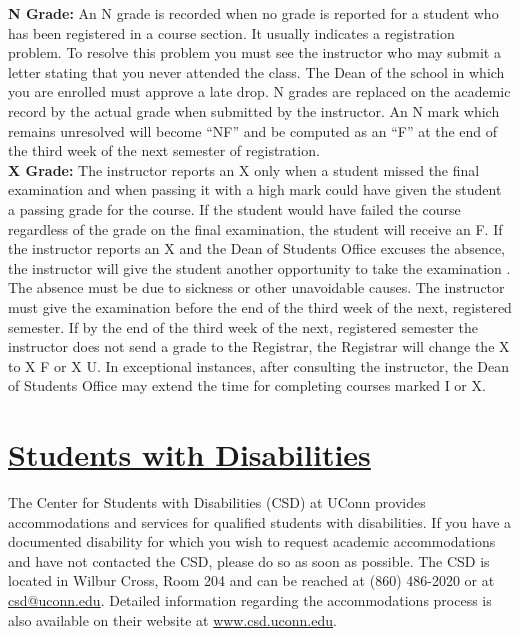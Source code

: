 \documentclass[11pt]{article}
\begin{document}
{\bf\noindent N Grade:} An N grade is recorded when no grade is reported for a student who has been registered in a course section. It usually indicates a registration problem. To resolve this problem you must see the instructor who may submit a letter stating that you never attended the class. The Dean of the school in which you are enrolled must approve a late drop. N grades are replaced on the academic record by the actual grade when submitted by the instructor. An N mark which remains unresolved will become “NF” and be computed as an “F” at the end of the third week of the next semester of registration.\\

{\bf\noindent X Grade:} The instructor reports an X only when a student missed the final examination and when passing it with a high mark could have given the student a passing grade for the course. If the student would have failed the course regardless of the grade on the final examination, the student will receive an F. If the instructor reports an X and the Dean of Students Office excuses the absence, the instructor will give the student another opportunity to take the examination . The absence must be due to sickness or other unavoidable causes. The instructor must give the examination before the end of the third week of the next, registered semester. If by the end of the third week of the next, registered semester the instructor does not send a grade to the Registrar, the Registrar will change the X to X F or X U. In exceptional instances, after consulting the instructor, the Dean of Students Office may extend the time for completing courses marked I or X.
\section*{\underline{Students with Disabilities}}
The Center for Students with Disabilities (CSD) at UConn provides accommodations and services for qualified students with disabilities. If you have a documented disability for which you wish to request academic accommodations and have not contacted the CSD, please do so as soon as possible. The CSD is located in Wilbur Cross, Room 204 and can be reached at (860) 486-2020 or at \href{mailto:csd@uconn.edu}{csd@uconn.edu}. Detailed information regarding the accommodations process is also available on their website at \url{www.csd.uconn.edu}.
\end{document}
